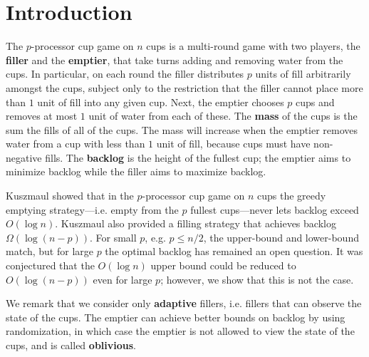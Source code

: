 \documentclass[twocolumn,11pt]{article}
\begin{document}
\section{Introduction}
The $p$-processor cup game on $n$ cups is a multi-round game with
two players, the \textbf{filler} and the \textbf{emptier}, that
take turns adding and removing water from the cups. In
particular, on each round the filler distributes $p$ units of
fill arbitrarily amongst the cups, subject only to the
restriction that the filler cannot place more than $1$ unit of
fill into any given cup. Next, the emptier chooses $p$ cups and
removes at most $1$ unit of water from each of these. The
\textbf{mass} of the cups is the sum the fills of all of the
cups. The mass will increase when the emptier removes water from
a cup with less than $1$ unit of fill, because cups must have
non-negative fills. The \textbf{backlog} is the height of the
fullest cup; the emptier aims to minimize backlog while the
filler aims to maximize backlog.

Kuszmaul\cite{ku20} showed that in the $p$-processor cup game on $n$ cups
the greedy emptying strategy---i.e. empty from the $p$ fullest
cups---never lets backlog exceed $O(\log n)$. Kuszmaul also
provided a filling strategy that achieves backlog $\Omega(\log
(n-p))$. For small $p$, e.g. $p \le n/2$, the upper-bound and
lower-bound match, but for large $p$ the optimal backlog has
remained an open question. It was conjectured that the $O(\log
n)$ upper bound could be reduced to $O(\log(n-p))$ even for large
$p$; however, we show that this is not the case.  

We remark that we consider only \textbf{adaptive} fillers, i.e. fillers
that can observe the state of the cups. The emptier can achieve
better bounds on backlog by using randomization, in which case
the emptier is not allowed to view the state of the cups, and is
called \textbf{oblivious}.
\end{document}
